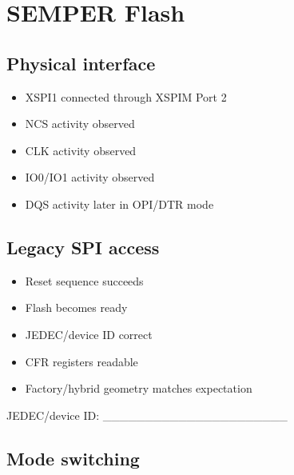 \documentclass[10pt,a4paper,oneside]{report}
\providecommand{\tightlist}{\setlength{\itemsep}{1pt}\setlength{\parskip}{1pt}}
\begin{document}
\section{SEMPER Flash}\label{wiki-hardware-bring-up-and-testing--7-semper-flash}

\subsection{Physical interface}\label{wiki-hardware-bring-up-and-testing--71-physical-interface}

\begin{itemize}
\tightlist
\item[$\square$]
  XSPI1 connected through XSPIM Port 2
\item[$\square$]
  NCS activity observed
\item[$\square$]
  CLK activity observed
\item[$\square$]
  IO0/IO1 activity observed
\item[$\square$]
  DQS activity later in OPI/DTR mode
\end{itemize}

\subsection{Legacy SPI access}\label{wiki-hardware-bring-up-and-testing--72-legacy-spi-access}

\begin{itemize}
\tightlist
\item[$\square$]
  Reset sequence succeeds
\item[$\square$]
  Flash becomes ready
\item[$\square$]
  JEDEC/device ID correct
\item[$\square$]
  CFR registers readable
\item[$\square$]
  Factory/hybrid geometry matches expectation
\end{itemize}

JEDEC/device ID: \_\_\_\_\_\_\_\_\_\_\_\_\_\_\_\_\_\_\_\_\_\_

\subsection{Mode switching}\label{wiki-hardware-bring-up-and-testing--73-mode-switching}
\end{document}
